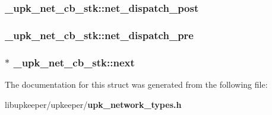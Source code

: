 \subsubsection[{net\_\-dispatch\_\-post}]{ {\bf \_\-upk\_\-net\_\-cb\_\-stk::net\_\-dispatch\_\-post}}\label{struct__upk__net__cb__stk_aa25feca04a93875eaadd0acf705c6fa2}
\subsubsection[{net\_\-dispatch\_\-pre}]{ {\bf \_\-upk\_\-net\_\-cb\_\-stk::net\_\-dispatch\_\-pre}}\label{struct__upk__net__cb__stk_ad521714e4b24eacccd56313716b2e80d}
\subsubsection[{next}]{$\ast$ {\bf \_\-upk\_\-net\_\-cb\_\-stk::next}}\label{struct__upk__net__cb__stk_a383cf4a1ff61d7ec6aa19a8db8918951}


The documentation for this struct was generated from the following file:\begin{DoxyCompactItemize}
\item 
libupkeeper/upkeeper/{\bf upk\_\-network\_\-types.h}\end{DoxyCompactItemize}
